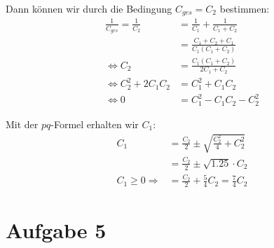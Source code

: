 \documentclass[11pt a4paper]{article}
\begin{document}
Dann können wir durch die Bedingung $C_{ges} = C_2$ bestimmen:
\begin{align*}
	\frac{1}{C_{ges}} = \frac{1}{C_2}
	&= \frac{1}{C_1} + \frac{1}{C_1 + C_2} \\
	&= \frac{C_1 + C_2 + C_1}{C_1 (C_1 + C_2)} \\
	\Leftrightarrow
	C_2 &= \frac{C_1 (C_1 + C_2)}{2C_1 + C_2} \\
	\Leftrightarrow
	C_2^2 + 2C_1C_2 &= C_1^2 + C_1C_2 \\
	\Leftrightarrow
	0 &= C_1^2 - C_1C_2 - C_2^2
\end{align*}

Mit der $pq$-Formel erhalten wir $C_1$:
\begin{align*}
	C_1 &= \frac{C_2}{2} \pm \sqrt{\frac{C_2^2}{4} + C_2^2} \\
	&= \frac{C_2}{2} \pm \sqrt{1.25} \cdot C_2 \\
	C_1 \geq 0 \Rightarrow
	&= \frac{C_2}{2} + \frac{5}{4} C_2 = \frac{7}{4} C_2
\end{align*}

\section*{Aufgabe 5}
\end{document}
